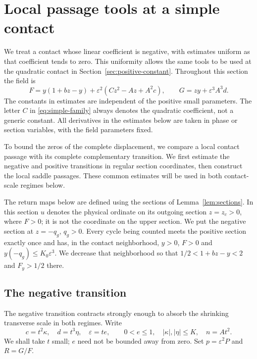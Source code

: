 \section{Local passage tools at a simple contact}
\label{sec:simple-contact-tools}

We treat a contact whose linear coefficient is negative, with estimates
uniform as that coefficient tends to zero. This uniformity allows the
same tools to be used at the quadratic contact in
Section~\ref{sec:positive-constant}.
Throughout this section the field is
\begin{equation}\label{eq:simple-family}
 F=y(1+bz-y)+\varepsilon^2(Cz^2-Az+A^2c),\qquad
 G=zy+\varepsilon^3A^3d.
\end{equation}
The constants in estimates are independent of the positive small
parameters.  The letter $C$ in \eqref{eq:simple-family} always denotes
the quadratic coefficient, not a generic constant.  All derivatives
in the estimates below are taken in phase or section variables, with
the field parameters fixed.

To bound the zeros of the complete displacement, we compare a local
contact passage with its complete complementary transition. We first
estimate the negative and positive transitions in regular section
coordinates, then construct the local saddle passages. These common
estimates will be used in both contact-scale regimes below.

The return maps below are defined using the sections of
Lemma~\ref{lem:sections}.  In this section $u$ denotes the physical
ordinate on its outgoing section $z=z_c>0$, where $F>0$; it is not the
coordinate on the upper section.  We put the negative section at
$z=-q_g$, $q_g>0$.
Every cycle being counted meets the positive section exactly once and
has, in the contact neighborhood, $y>0$, $F>0$ and
$y(-q_g)\le K_0\varepsilon^3$.  We decrease that neighborhood so that
$1/2<1+bz-y<2$ and $F_y>1/2$ there.

\subsection{The negative transition}

The negative transition contracts strongly enough to absorb the shrinking
transverse scale in both regimes. Write
\begin{equation}\label{eq:simple-tail-parameters}
 c=t^2\kappa,\quad d=t^3\eta,\quad \varepsilon=te,
 \qquad 0<e\le1,\quad |\kappa|,|\eta|\le K,
 \quad n=At^2.
\end{equation}
We shall take $t$ small; $e$ need not be bounded away from zero.
Set $p=\varepsilon^2P$ and $R=G/F$.

